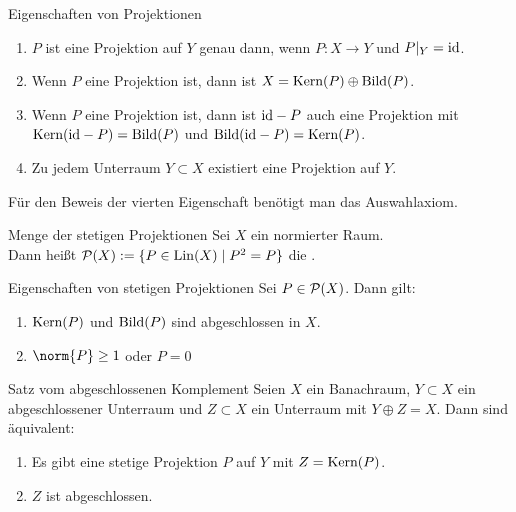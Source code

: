 \begin{Lemma}{Eigenschaften von Projektionen}
    \begin{enumerate}
        \item
        $P$ ist eine Projektion auf $Y$ genau dann, wenn $P\colon X \rightarrow Y$ und
        $P|_Y = \id$.
        
        \item
        Wenn $P$ eine Projektion ist, dann ist $X = \Kern(P) \oplus \Bild(P)$.
        
        \item
        Wenn $P$ eine Projektion ist, dann ist $\id - P$ auch eine Projektion mit\\
        $\Kern(\id - P) = \Bild(P)$ und $\Bild(\id - P) = \Kern(P)$.
        
        \item
        Zu jedem Unterraum $Y \subset X$ existiert eine Projektion auf $Y$.
    \end{enumerate}
\end{Lemma}

\begin{Bem}
    Für den Beweis der vierten Eigenschaft benötigt man das Auswahlaxiom.
\end{Bem}

\linie

\begin{Def}{Menge der stetigen Projektionen}
    Sei $X$ ein normierter Raum.\\
    Dann heißt $\P(X) := \{P \in \Lin(X) \;|\; P^2 = P\}$ die
    .
\end{Def}

\begin{Lemma}{Eigenschaften von stetigen Projektionen}
    Sei $P \in \P(X)$.
    Dann gilt:
    \begin{enumerate}
        \item
        $\Kern(P)$ und $\Bild(P)$ sind abgeschlossen in $X$.
        
        \item
        $\norm{P} \ge 1$ oder $P = 0$
    \end{enumerate}
\end{Lemma}

\linie

\begin{Satz}{Satz vom abgeschlossenen Komplement}
    Seien $X$ ein Banachraum, $Y \subset X$ ein abgeschlossener Unterraum und
    $Z \subset X$ ein Unterraum mit $Y \oplus Z = X$.
    Dann sind äquivalent:
    \begin{enumerate}
        \item
        Es gibt eine stetige Projektion $P$ auf $Y$ mit $Z = \Kern(P)$.
        
        \item
        $Z$ ist abgeschlossen.
    \end{enumerate}
\end{Satz}


